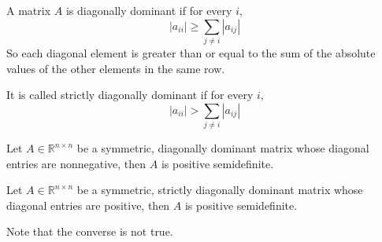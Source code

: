 \begin{definition}
  A matrix $A$ is diagonally dominant if for every $i$, $$|a_{ii}| \geq \sum_{j \neq i} |a_{ij}|$$
  So each diagonal element is greater than or equal to the sum of the absolute values of the other elements in the same row.

  It is called strictly diagonally dominant if for every $i$, $$|a_{ii}| > \sum_{j \neq i} |a_{ij}|$$
\end{definition}
\begin{proposition}
  Let $A \in \mathbb R^{n \times n}$ be a symmetric, diagonally dominant matrix whose diagonal entries are nonnegative, then $A$ is positive semidefinite.

  \bigskip
  Let $A \in \mathbb R^{n \times n}$ be a symmetric, strictly diagonally dominant matrix whose diagonal entries are positive, then $A$ is positive semidefinite.

  \bigskip
  Note that the converse is not true.
\end{proposition}